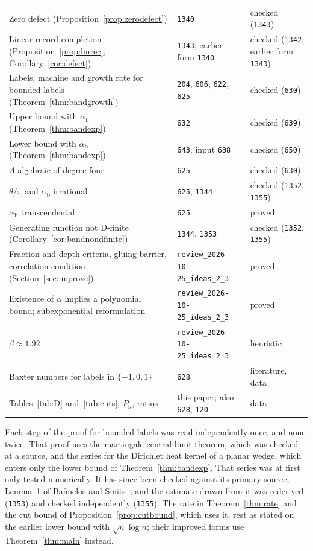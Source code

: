 \begin{center}
\begin{tabular}{>{\raggedright\arraybackslash}p{}>{\raggedright\arraybackslash}p{}>{\raggedright\arraybackslash}p{}}
Zero defect (Proposition~\ref{prop:zerodefect}) & \texttt{1340} & checked (\texttt{1343})\\
Linear-record completion (Proposition~\ref{prop:linrec}, Corollary~\ref{cor:defect}) & \texttt{1343}; earlier form \texttt{1340} & checked (\texttt{1342}; earlier form \texttt{1343})\\
Labels, machine and growth rate for bounded labels (Theorem~\ref{thm:bandgrowth}) & \texttt{204}, \texttt{606}, \texttt{622}, \texttt{625} & checked (\texttt{630})\\
Upper bound with $\alpha_{\mathrm b}$ (Theorem~\ref{thm:bandexp}) & \texttt{632} & checked (\texttt{639})\\
Lower bound with $\alpha_{\mathrm b}$ (Theorem~\ref{thm:bandexp}) & \texttt{643}; input \texttt{638} & checked (\texttt{650})\\
$\Lambda$ algebraic of degree four & \texttt{625} & checked (\texttt{630})\\
$\theta/\pi$ and $\alpha_{\mathrm b}$ irrational & \texttt{625}, \texttt{1344} & checked (\texttt{1352}, \texttt{1355})\\
$\alpha_{\mathrm b}$ transcendental & \texttt{625} & proved\\
Generating function not D-finite (Corollary~\ref{cor:bandnondfinite}) & \texttt{1344}, \texttt{1353} & checked (\texttt{1352}, \texttt{1355})\\
Fraction and depth criteria, gluing barrier, correlation condition (Section~\ref{sec:improve}) & \texttt{review\_2026-10-25\_\allowbreak ideas\_2\_3} & proved\\
Existence of $\alpha$ implies a polynomial bound; subexponential reformulation & \texttt{review\_2026-10-25\_\allowbreak ideas\_2\_3} & proved\\
$\beta\approx1.92$ & \texttt{review\_2026-10-25\_\allowbreak ideas\_2\_3} & heuristic\\
Baxter numbers for labels in $\{-1,0,1\}$ & \texttt{628} & literature, data\\
Tables~\ref{tab:D} and~\ref{tab:cuts}, $P_n$, ratios & this paper; also \texttt{628}, \texttt{120} & data\\
\bottomrule
\end{tabular}
\end{center}

Each step of the proof for bounded labels was read independently once, and none twice. That proof
uses the martingale central limit theorem, which was checked at a source, and the series for the
Dirichlet heat kernel of a planar wedge, which enters only the lower bound of Theorem~\ref{thm:bandexp}.
That series was at first only tested numerically. It has since been checked against its primary source,
Lemma~1 of Ba\~nuelos and Smits~\cite{BanuelosSmits1997}, and the estimate drawn from it was rederived
(\texttt{1353}) and checked independently (\texttt{1355}). The rate in Theorem~\ref{thm:rate} and the
cut bound of Proposition~\ref{prop:cutbound}, which uses it, rest as stated on the earlier lower bound
with $\sqrt n\log n$; their improved forms use Theorem~\ref{thm:main} instead.
